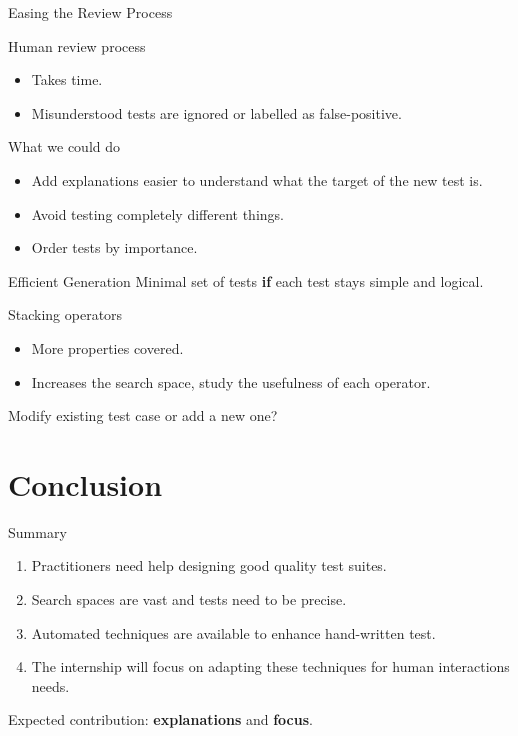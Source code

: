 \documentclass{beamer}
\begin{document}
\begin{frame}{Easing the Review Process}
  \begin{block}{Human review process}
    \begin{itemize}
      \item Takes time.
      \item Misunderstood tests are ignored or labelled as false-positive.
    \end{itemize}
  \end{block}

  \begin{block}{What we could do}
    \begin{itemize}
      \item Add explanations \textbf{\textrightarrow} easier to understand what the target of the new test is.
      \item Avoid testing completely different things.
      \item Order tests by importance.
    \end{itemize}
  \end{block}
\end{frame}

\begin{frame}{Efficient Generation}
  Minimal set of tests \textbf{if} each test stays simple and logical.

  \vfill

  \begin{block}{Stacking operators}
    \begin{itemize}
      \item More properties covered.
      \item Increases the search space, study the usefulness of each operator.
    \end{itemize}
  \end{block}

  Modify existing test case or add a new one?
\end{frame}


\section*{Conclusion}

\begin{frame}{Summary}
  \begin{enumerate}
    \item Practitioners need help designing good quality test suites.
    \item Search spaces are vast and tests need to be precise. %
    \item Automated techniques are available to enhance hand-written test.
    \item The internship will focus on adapting these techniques for human interactions needs.
  \end{enumerate}
  Expected contribution: \textbf{explanations} and \textbf{focus}.
\end{frame}
\end{document}
